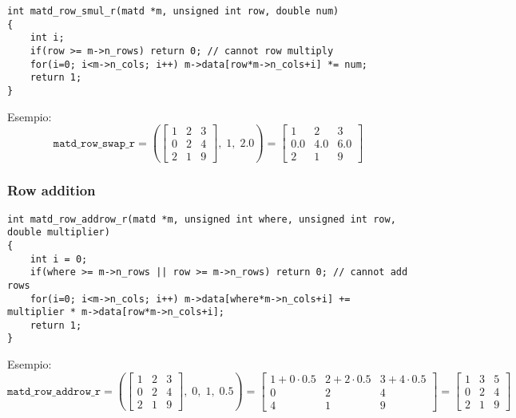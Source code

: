 \documentclass[10pt]{article}
\begin{document}
\begin{lstlisting}
int matd_row_smul_r(matd *m, unsigned int row, double num)
{
	int i;
	if(row >= m->n_rows) return 0; // cannot row multiply
	for(i=0; i<m->n_cols; i++) m->data[row*m->n_cols+i] *= num;
	return 1;
}
\end{lstlisting}

Esempio:
\begin{equation*}
\mathtt{matd\_row\_swap\_r} = \left( 
\begin{bmatrix}
1 & 2 & 3 \\ 0 & 2 & 4 \\ 2 & 1 & 9
\end{bmatrix}, \; 1, \; 2.0
\right) = 
\begin{bmatrix}
1 & 2 & 3 \\ 0.0 & 4.0 & 6.0 \\ 2 & 1 & 9
\end{bmatrix}
\end{equation*}

\subsubsection{Row addition}

\begin{lstlisting}
int matd_row_addrow_r(matd *m, unsigned int where, unsigned int row, double multiplier)
{
	int i = 0;
	if(where >= m->n_rows || row >= m->n_rows) return 0; // cannot add rows
	for(i=0; i<m->n_cols; i++) m->data[where*m->n_cols+i] += multiplier * m->data[row*m->n_cols+i];
	return 1;
}
\end{lstlisting}

Esempio:
\begin{equation*}
\mathtt{matd\_row\_addrow\_r} = \left( 
\begin{bmatrix}
1 & 2 & 3 \\ 0 & 2 & 4 \\ 2 & 1 & 9
\end{bmatrix}, \; 0, \; 1, \; 0.5
\right) = 
\begin{bmatrix}
1+0\cdot 0.5 & 2+2\cdot 0.5 & 3+4\cdot 0.5 \\
0 & 2 & 4 \\
4 & 1 & 9
\end{bmatrix} = 
\begin{bmatrix}
1 & 3 & 5 \\ 0 & 2 & 4 \\ 2 & 1 & 9
\end{bmatrix}
\end{equation*}
\end{document}
